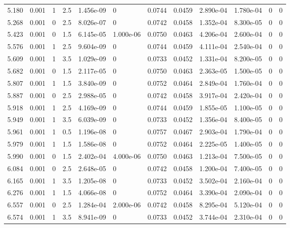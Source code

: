 \documentclass[preview]{standalone}
\begin{document}
{{{\begin{tabular}{L{1.2cm}C{1.2cm} C{0.3cm}C{0.5cm} C{1.4cm}C{1.4cm} C{1.4cm}C{1.4cm} C{1.6cm}C{1.6cm} C{1.6cm}C{1.6cm}}
  5.180  &  0.001  & 1     & 2.5 &  1.456e-09  & 0  &  0.0744&   0.0459& 2.890e-04 & 1.780e-04   &  0 & 0  \\ 
  5.268  &  0.001  & 0     & 2.5 &  8.026e-07  & 0  &  0.0742&   0.0458& 1.352e-04 & 8.300e-05   &  0 & 0  \\ 
  5.423  &  0.001  & 0     & 1.5 &  6.145e-05  & 1.000e-06  &  0.0750&   0.0463& 4.206e-04 & 2.600e-04   &  0 & 0  \\ 
  5.576  &  0.001  & 1     & 2.5 &  9.604e-09  & 0  &  0.0744&   0.0459& 4.111e-04 & 2.540e-04   &  0 & 0  \\ 
  5.609  &  0.001  & 1     & 3.5 &  1.029e-09  & 0  &  0.0733&   0.0452& 1.331e-04 & 8.200e-05   &  0 & 0  \\ 
  5.682  &  0.001  & 0     & 1.5 &  2.117e-05  & 0  &  0.0750&   0.0463& 2.363e-05 & 1.500e-05   &  0 & 0  \\ 
  5.807  &  0.001  & 1     & 1.5 &  3.840e-09  & 0  &  0.0752&   0.0464& 2.849e-04 & 1.760e-04   &  0 & 0  \\ 
  5.887  &  0.001  & 0     & 2.5 &  2.988e-05  & 0  &  0.0742&   0.0458& 3.917e-04 & 2.420e-04   &  0 & 0  \\ 
  5.918  &  0.001  & 1     & 2.5 &  4.169e-09  & 0  &  0.0744&   0.0459& 1.855e-05 & 1.100e-05   &  0 & 0  \\ 
  5.949  &  0.001  & 1     & 3.5 &  6.039e-09  & 0  &  0.0733&   0.0452& 1.356e-04 & 8.400e-05   &  0 & 0  \\ 
  5.961  &  0.001  & 1     & 0.5 &  1.196e-08  & 0  &  0.0757&   0.0467& 2.903e-04 & 1.790e-04   &  0 & 0  \\ 
  5.979  &  0.001  & 1     & 1.5 &  1.586e-08  & 0  &  0.0752&   0.0464& 2.225e-05 & 1.400e-05   &  0 & 0  \\ 
  5.990  &  0.001  & 0     & 1.5 &  2.402e-04  & 4.000e-06  &  0.0750&   0.0463& 1.213e-04 & 7.500e-05   &  0 & 0  \\ 
  6.084  &  0.001  & 0     & 2.5 &  2.648e-05  & 0  &  0.0742&   0.0458& 1.200e-04 & 7.400e-05   &  0 & 0  \\ 
  6.165  &  0.001  & 1     & 3.5 &  1.205e-08  & 0  &  0.0733&   0.0452& 3.502e-04 & 2.160e-04   &  0 & 0  \\ 
  6.276  &  0.001  & 1     & 1.5 &  4.066e-08  & 0  &  0.0752&   0.0464& 3.390e-04 & 2.090e-04   &  0 & 0  \\ 
  6.557  &  0.001  & 0     & 2.5 &  1.284e-04  & 2.000e-06  &  0.0742&   0.0458& 8.295e-04 & 5.120e-04   &  0 & 0  \\ 
  6.574  &  0.001  & 1     & 3.5 &  8.941e-09  & 0  &  0.0733&   0.0452& 3.744e-04 & 2.310e-04   &  0 & 0  \\ 

\end{tabular}}}}
\end{document}
